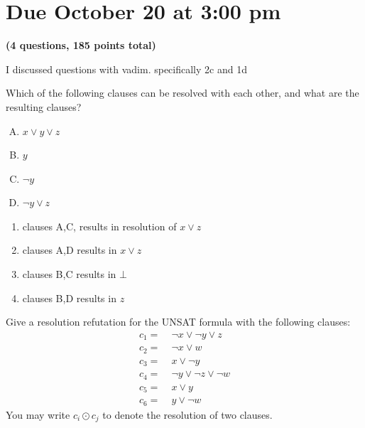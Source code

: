 \documentclass[11pt]{article}
\begin{document}
\maketitle

\section*{Due October 20 at 3:00 pm}

\textbf{(4 questions, 185 points total)}

I discussed questions with vadim. specifically 2c and 1d

\begin{qunlist}

  \begin{qparts}
  \item
    Which of the following clauses can be resolved with each other, and what are the resulting clauses?
    \begin{enumerate}[(A)]
      \item $x \lor y \lor z$
      \item $y$
      \item $\lnot y$
      \item $\lnot y \lor z$
    \end{enumerate}

    \begin{answer}
      \begin{enumerate}
        \item clauses A,C, results in resolution of \(x\lor z\)
        \item clauses A,D results in \(x\lor z\)
        \item clauses B,C results in \(\bot\)
        \item clauses B,D results in \(z\)
      \end{enumerate}
    \end{answer}

  \item
    Give a resolution refutation for the UNSAT formula with the following clauses:
    \begin{align*}
      c_1=\;&\lnot x \lor \lnot y \lor z \\
      c_2=\;&\lnot x \lor w \\
      c_3=\;&x \lor \lnot y \\
      c_4=\;&\lnot y \lor \lnot z \lor \lnot w \\
      c_5=\;&x \lor y \\
      c_6=\;&y \lor \lnot w
    \end{align*}
    You may write  $c_i \odot c_j$ to denote the resolution of two clauses.


\end{qparts}
\end{qunlist}
\end{document}
